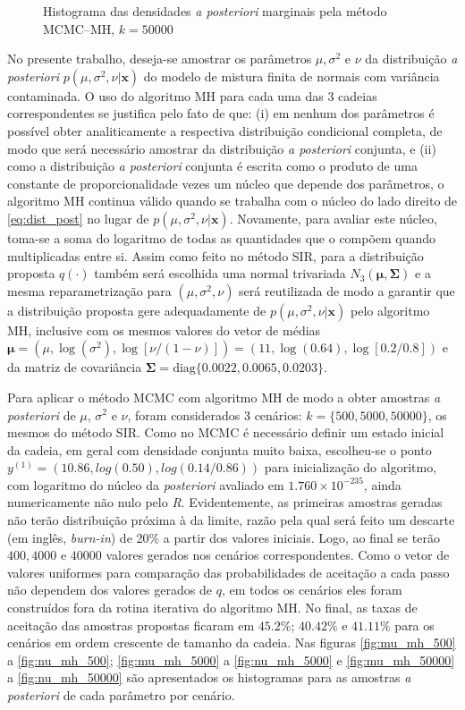 \begin{figure}[t]
	\caption{Histograma das densidades \textit{a posteriori} marginais pela método MCMC--MH, $k = 50000$}%
\end{figure}

No presente trabalho, deseja-se amostrar os parâmetros $\mu, \sigma^2$ e $\nu$ da distribuição \textit{a posteriori} $p(\mu, \sigma^2, \nu | \bm{x})$ do modelo de mistura finita de normais com variância contaminada. O uso do algoritmo MH para cada uma das 3 cadeias correspondentes se justifica pelo fato de que: (i) em nenhum dos parâmetros é possível obter analiticamente a respectiva distribuição condicional completa, de modo que será necessário amostrar da distribuição \textit{a posteriori} conjunta, e (ii) como a distribuição \textit{a posteriori} conjunta é escrita como o produto de uma constante de proporcionalidade vezes um núcleo que depende dos parâmetros, o algoritmo MH continua válido quando se trabalha com o núcleo do lado direito de \eqref{eq:dist_post} no lugar de $p(\mu, \sigma^2, \nu | \bm{x})$. Novamente, para avaliar este núcleo, toma-se a soma do logaritmo de todas as quantidades que o compõem quando multiplicadas entre si. Assim como feito no método SIR, para a distribuição proposta $q(\cdot)$ também será escolhida uma normal trivariada $N_3(\bm{\mu}, \bm{\Sigma})$ e a mesma reparametrização para $(\mu, \sigma^2, \nu)$ será reutilizada de modo a garantir que a distribuição proposta gere adequadamente de $p(\mu, \sigma^2, \nu | \bm{x})$ pelo algoritmo MH, inclusive com os mesmos valores do vetor de médias $\bm{\mu} = (\mu, \log(\sigma^2), \log[\nu/(1-\nu)]) = (11, \log(0.64), \log[0.2/0.8])$ e da matriz de covariância $\bm{\Sigma} = \textrm{diag}\{0.0022, 0.0065, 0.0203\}$.

Para aplicar o método MCMC com algoritmo MH de modo a obter amostras \textit{a posteriori} de $\mu$, $\sigma^2$ e $\nu$, foram considerados 3 cenários: $k = \{500, 5000, 50000\}$, os mesmos do método SIR. Como no MCMC é necessário definir um estado inicial da cadeia, em geral com densidade conjunta muito baixa, escolheu-se o ponto $y^{(1)} = (10.86, log(0.50), log(0.14/0.86))$ para inicialização do algoritmo, com logaritmo do núcleo da \textit{posteriori} avaliado em $1.760 \times 10^{-235}$, ainda numericamente não nulo pelo \textit{R}. Evidentemente, as primeiras amostras geradas não terão distribuição próxima à da limite, razão pela qual será feito um descarte (em inglês, \textit{burn-in}) de 20\% a partir dos valores iniciais. Logo, ao final se terão $400, 4000$ e $40000$ valores gerados nos cenários correspondentes. Como o vetor de valores uniformes para comparação das probabilidades de aceitação a cada passo não dependem dos valores gerados de $q$, em todos os cenários eles foram construídos fora da rotina iterativa do algoritmo MH. No final, as taxas de aceitação das amostras propostas ficaram em $45.2\%$; $40.42\%$ e $41.11\%$ para os cenários em ordem crescente de tamanho da cadeia. Nas figuras \ref{fig:mu_mh_500} a \ref{fig:nu_mh_500}; \ref{fig:mu_mh_5000} a \ref{fig:nu_mh_5000} e \ref{fig:mu_mh_50000} a \ref{fig:nu_mh_50000} são apresentados os histogramas para as amostras \textit{a posteriori} de cada parâmetro por cenário.

